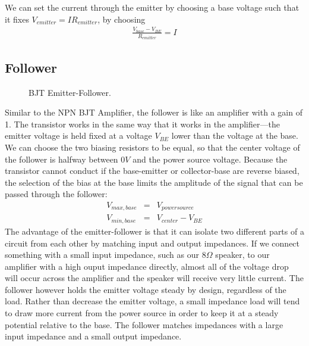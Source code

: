 \documentclass[12pt]{article}
\begin{document}
We can set the current through the emitter by choosing a base voltage such that it fixes $V_{emitter} = IR_{emitter}$, by choosing
\begin{eqnarray}
 \frac{V_{base} - V_{BE}}{R_{emitter}} = I \label{eq:setcurrent}
\end{eqnarray}

\subsection*{Follower}
\begin{figure}[H]
\caption{BJT Emitter-Follower.}
\label{fig:follwer_diagram}
\end{figure}
Similar to the NPN BJT Amplifier, the follower is like an amplifier with a gain of 1. The transistor works in the same way that it works in the amplifier---the emitter voltage is held fixed at a voltage $V_{BE}$ lower than the voltage at the base. We can choose the two biasing resistors to be equal, so that the center voltage of the follower is halfway between $0V$ and the power source voltage. Because the transistor cannot conduct if the base-emitter or collector-base are reverse biased, the selection of the bias at the base limits the amplitude of the signal that can be passed through the follower:
\begin{eqnarray}
V_{max,base} &=&V_{powersource}\label{eq:maxbase}\\
V_{min,base} &=& V_{center} - V_{BE}\label{eq:minbase}
\end{eqnarray}
The advantage of the emitter-follower is that it can isolate two different parts of a circuit from each other by matching input and output impedances. If we connect something with a small input impedance, such as our $8\Omega$ speaker, to our amplifier with a high ouput impedance directly, almost all of the voltage drop will occur across the amplifier and the speaker will receive very little current. The follower however holds the emitter voltage steady by design, regardless of the load. Rather than decrease the emitter voltage, a small impedance load will tend to draw more current from the power source in order to keep it at a steady potential relative to the base. The follower matches impedances with a large input impedance and a small output impedance.
\end{document}
